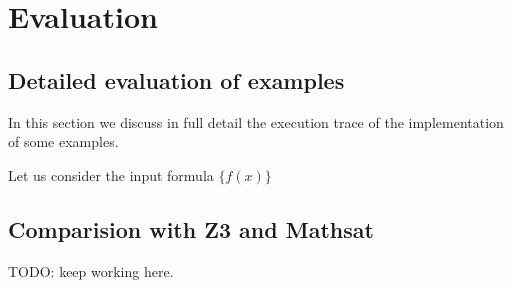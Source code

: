 \section{Evaluation}

\subsection{Detailed evaluation of examples}

In this section we discuss in full detail the execution trace
of the implementation of some examples. 

Let us consider the input formula $\{f(x)\}$

\subsection{Comparision with Z3 and Mathsat}
TODO: keep working here.

